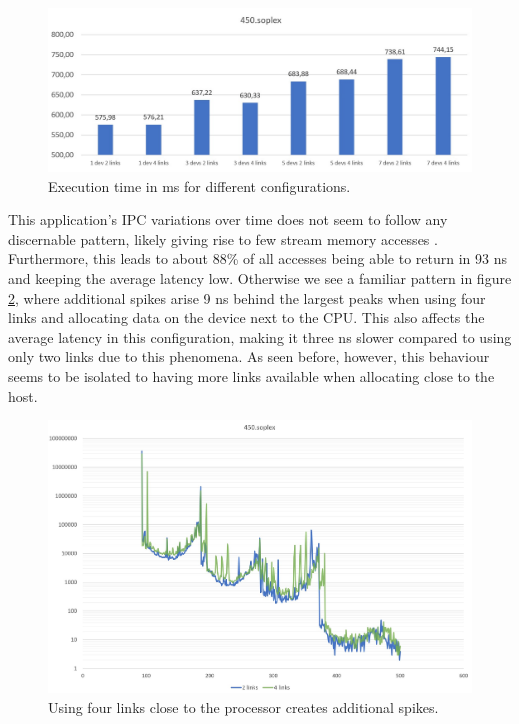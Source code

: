 \begin{figure}[!ht]
    \centering
    \includegraphics[width=1.0\linewidth]{figure/450-exectime.jpg}
    \caption{Execution time in ms for different configurations.}
    \label{Memory-access-450-exectime}
\end{figure}

This application's IPC variations over time does not seem to follow any discernable pattern, likely giving rise to few stream memory accesses \cite{song2018experiments}. Furthermore, this leads to about 88\% of all accesses being able to return in 93 ns and keeping the average latency low. Otherwise we see a familiar pattern in figure \ref{Memory-access-450-2-dev-4-8-links}, where additional spikes arise 9 ns behind the largest peaks when using four links and allocating data on the device next to the CPU. This also affects the average latency in this configuration, making it three ns slower compared to using only two links due to this phenomena. As seen before, however, this behaviour seems to be isolated to having more links available when allocating close to the host. 
\bigskip

\begin{figure}[!ht]
    \centering
    \includegraphics[width=1.0\linewidth]{figure/450-2_4-8.jpg}
    \caption{Using four links close to the processor creates additional spikes.}
    \label{Memory-access-450-2-dev-4-8-links}
\end{figure}

